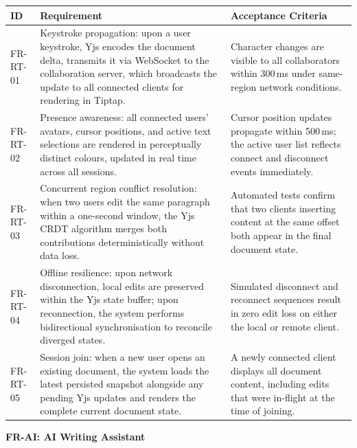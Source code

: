 \documentclass{article}
\begin{document}
\noindent
\begin{tabularx}{\textwidth}{|>{\hsize=0.2\hsize}X|>{\hsize=1.8\hsize}X|>{\hsize=1\hsize}X|}
    \hline
    \rowcolor{tableBlue} 
    \textbf{\color{white}ID} & 
    \textbf{\color{white}Requirement} & 
    \textbf{\color{white}Acceptance Criteria} \\
    \hline
    FR-RT-01 &
    Keystroke propagation: upon a user keystroke, Yjs encodes the document delta, transmits it via WebSocket to the collaboration server, which broadcasts the update to all connected clients for rendering in Tiptap. &
    Character changes are visible to all collaborators within 300\,ms under same-region network conditions. \\
    \hline
    FR-RT-02 &
    Presence awareness: all connected users' avatars, cursor positions, and active text selections are rendered in perceptually distinct colours, updated in real time across all sessions. &
    Cursor position updates propagate within 500\,ms; the active user list reflects connect and disconnect events immediately. \\
    \hline
    FR-RT-03 &
    Concurrent region conflict resolution: when two users edit the same paragraph within a one-second window, the Yjs CRDT algorithm merges both contributions deterministically without data loss. &
    Automated tests confirm that two clients inserting content at the same offset both appear in the final document state. \\
    \hline
    FR-RT-04 &
    Offline resilience: upon network disconnection, local edits are preserved within the Yjs state buffer; upon reconnection, the system performs bidirectional synchronisation to reconcile diverged states. &
    Simulated disconnect and reconnect sequences result in zero edit loss on either the local or remote client. \\
    \hline
    FR-RT-05 &
    Session join: when a new user opens an existing document, the system loads the latest persisted snapshot alongside any pending Yjs updates and renders the complete current document state. &
    A newly connected client displays all document content, including edits that were in-flight at the time of joining. \\
    \hline
\end{tabularx}

\noindent\textbf{FR-AI: AI Writing Assistant}
\vspace{5pt}
\end{document}
